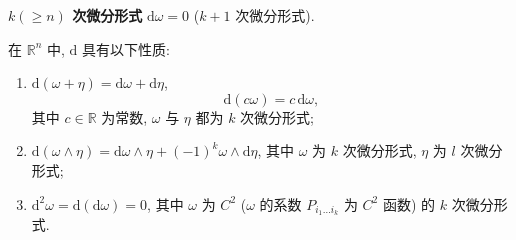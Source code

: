 \textbf{$k(\geqslant n)$ 次微分形式} $\mathrm{d}\omega=0$ ($k+1$ 次微分形式).

\begin{theorem}\label{thm:11.3.1}
在 $\mathbb{R}^{n}$ 中, $\mathrm{d}$ 具有以下性质:
\begin{enumerate}
\item $\mathrm{d}(\omega+\eta)=\mathrm{d}\omega+\mathrm{d}\eta$,
\[
\mathrm{d}(c\omega)=c\,\mathrm{d}\omega,
\]
其中 $c\in\mathbb{R}$ 为常数, $\omega$ 与 $\eta$ 都为 $k$ 次微分形式;
\item $\mathrm{d}(\omega\wedge\eta)=\mathrm{d}\omega\wedge\eta+(-1)^{k}\omega\wedge\mathrm{d}\eta$, 其中 $\omega$ 为 $k$ 次微分形式, $\eta$ 为 $l$ 次微分形式;
\item $\mathrm{d}^{2}\omega=\mathrm{d}(\mathrm{d}\omega)=0$, 其中 $\omega$ 为 $C^{2}$ ($\omega$ 的系数 $P_{i_{1}\ldots i_{k}}$ 为 $C^{2}$ 函数) 的 $k$ 次微分形式.
\end{enumerate}
\end{theorem}
